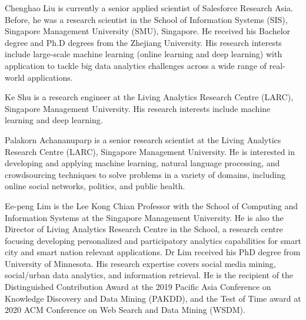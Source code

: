 \documentclass[journal]{IEEEtran}
\begin{document}
\begin{IEEEbiography}{Chenghao Liu}
is currently a senior applied scientist of Salesforce Research Asia. Before, he was a research scientist in the School of Information Systems (SIS), Singapore Management University (SMU), Singapore. He received his Bachelor degree and Ph.D degrees from the Zhejiang University. His research interests include large-scale machine learning (online learning and deep learning) with application to tackle big data analytics challenges across a wide range of real-world applications.
\end{IEEEbiography}

\begin{IEEEbiography}{Ke Shu}
is a research engineer at the Living Analytics Research Centre (LARC), Singapore Management University. His research interests include machine learning and deep learning.
\end{IEEEbiography}

\begin{IEEEbiography}{Palakorn Achananuparp}
is a senior research scientist at the Living Analytics Research Centre (LARC), Singapore Management University. He is interested in developing and applying machine learning, natural language processing, and crowdsourcing techniques to solve problems in a variety of domains, including online social networks, politics, and public health.
\end{IEEEbiography}

\begin{IEEEbiography}{Ee-peng Lim}
is the Lee Kong Chian Professor with the School of Computing and Information Systems at the Singapore Management University. He is also the Director of Living Analytics Research Centre in the School, a research centre focusing developing personalized and participatory analytics capabilities for smart city and smart nation relevant applications. Dr Lim received his PhD degree from University of Minnesota. His research expertise covers social media mining, social/urban data analytics, and information retrieval. He is the recipient of the Distinguished Contribution Award at the 2019 Pacific Asia Conference on Knowledge Discovery and Data Mining (PAKDD), and the Test of Time award at 2020 ACM Conference on Web Search and Data Mining (WSDM).
\end{IEEEbiography}
\end{document}
